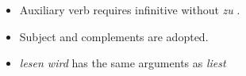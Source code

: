{\begin{itemize}
\item Auxiliary verb requires infinitive without \emph{zu} .
\pause
\item Subject  and complements  are adopted.
\pause
\item \emph{lesen wird} has the same arguments as \emph{liest}
\end{itemize}

}


